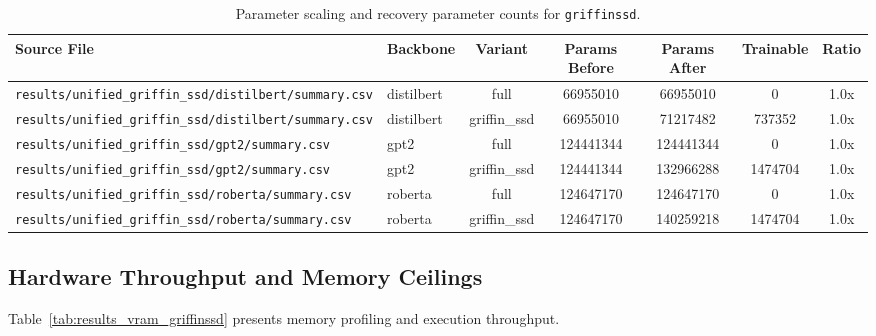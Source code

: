 \begin{table}[t]
\centering
\small
\begin{tabular}{llccccc}
\toprule
\textbf{Source File} & \textbf{Backbone} & \textbf{Variant} & \textbf{Params Before} & \textbf{Params After} & \textbf{Trainable} & \textbf{Ratio} \\
\midrule
\texttt{results/unified\_griffin\_ssd/distilbert/summary.csv} & distilbert & full & 66955010 & 66955010 & 0 & 1.0x \\
\texttt{results/unified\_griffin\_ssd/distilbert/summary.csv} & distilbert & griffin\_ssd & 66955010 & 71217482 & 737352 & 1.0x \\
\texttt{results/unified\_griffin\_ssd/gpt2/summary.csv} & gpt2 & full & 124441344 & 124441344 & 0 & 1.0x \\
\texttt{results/unified\_griffin\_ssd/gpt2/summary.csv} & gpt2 & griffin\_ssd & 124441344 & 132966288 & 1474704 & 1.0x \\
\texttt{results/unified\_griffin\_ssd/roberta/summary.csv} & roberta & full & 124647170 & 124647170 & 0 & 1.0x \\
\texttt{results/unified\_griffin\_ssd/roberta/summary.csv} & roberta & griffin\_ssd & 124647170 & 140259218 & 1474704 & 1.0x \\
\bottomrule
\end{tabular}
\caption{Parameter scaling and recovery parameter counts for \texttt{griffinssd}.}
\label{tab:results_params_griffinssd}
\end{table}

\subsection{Hardware Throughput and Memory Ceilings}
Table~\ref{tab:results_vram_griffinssd} presents memory profiling and execution throughput.


